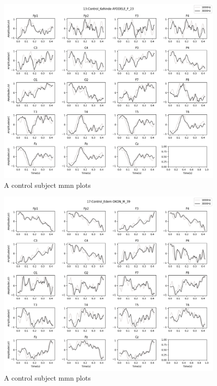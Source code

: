 \documentclass[10pt]{article}
\begin{document}
\begin{figure}[H]
  \includegraphics[width=16cm]{../../../data_analysis_results/MMN/time_series/Control/13.png}
  \caption{A control subject \gls{mmn} plots}
\end{figure}
\begin{figure}[H]
  \includegraphics[width=16cm]{../../../data_analysis_results/MMN/time_series/Control/17.png}
  \caption{A control subject \gls{mmn} plots}
\end{figure}
\end{document}

